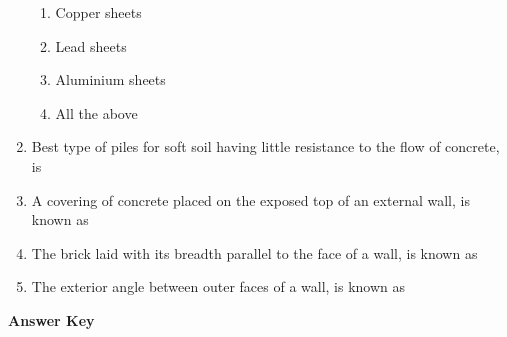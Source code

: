 \documentclass[11pt,a4paper]{article}
\begin{document}
\begin{enumerate}
\begin{enumerate}[label=\Alph*.]
\item{Copper sheets}
\item{Lead sheets}
\item{Aluminium sheets}
\item{All the above}
\end{enumerate}
\item{Best type of piles for soft soil having little resistance to the flow of concrete, is}
\\
\item{A covering of concrete placed on the exposed top of an external wall, is known as}
\\
\item{The brick laid with its breadth parallel to the face of a wall, is known as}
\\
\item{The exterior angle between outer faces of a wall, is known as}
\\
\end{enumerate}
\textbf{Answer Key}
\end{document}
